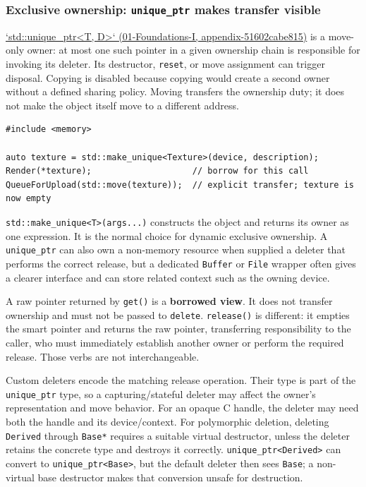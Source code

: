 \subsubsection{\texorpdfstring{Exclusive ownership: \texttt{unique\_ptr} makes transfer visible}{Exclusive ownership: unique\_ptr makes transfer visible}}\label{exclusive-ownership-unique_ptr-makes-transfer-visible}

\href{}{`std::unique\_ptr\textless T, D\textgreater` (01-Foundations-I, appendix-51602cabe815)} is a move-only owner: at most one such pointer in a given ownership chain is responsible for invoking its deleter. Its destructor, \texttt{reset}, or move assignment can trigger disposal. Copying is disabled because copying would create a second owner without a defined sharing policy. Moving transfers the ownership duty; it does not make the object itself move to a different address.

\begin{verbatim}
#include <memory>

auto texture = std::make_unique<Texture>(device, description);
Render(*texture);                    // borrow for this call
QueueForUpload(std::move(texture));  // explicit transfer; texture is now empty
\end{verbatim}

\texttt{std::make\_unique\textless{}T\textgreater{}(args...)} constructs the object and returns its owner as one expression. It is the normal choice for dynamic exclusive ownership. A \texttt{unique\_ptr} can also own a non-memory resource when supplied a deleter that performs the correct release, but a dedicated \texttt{Buffer} or \texttt{File} wrapper often gives a clearer interface and can store related context such as the owning device.

A raw pointer returned by \texttt{get()} is a \textbf{borrowed view}. It does not transfer ownership and must not be passed to \texttt{delete}. \texttt{release()} is different: it empties the smart pointer and returns the raw pointer, transferring responsibility to the caller, who must immediately establish another owner or perform the required release. Those verbs are not interchangeable.

Custom deleters encode the matching release operation. Their type is part of the \texttt{unique\_ptr} type, so a capturing/stateful deleter may affect the owner's representation and move behavior. For an opaque C handle, the deleter may need both the handle and its device/context. For polymorphic deletion, deleting \texttt{Derived} through \texttt{Base*} requires a suitable virtual destructor, unless the deleter retains the concrete type and destroys it correctly. \texttt{unique\_ptr\textless{}Derived\textgreater{}} can convert to \texttt{unique\_ptr\textless{}Base\textgreater{}}, but the default deleter then sees \texttt{Base}; a non-virtual base destructor makes that conversion unsafe for destruction.

